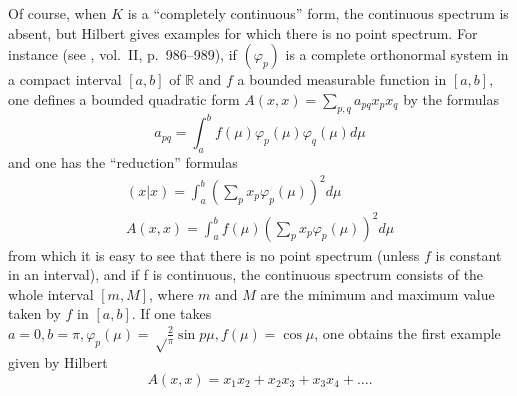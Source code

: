 \documentclass[12pt,a4paper,leqno,twoside]{extbook}
\newcommand{\R}{\mathbb{R}}
\begin{document}
Of course, when \(K\) is a ``completely continuous'' form, the continuous spectrum is absent, but Hilbert gives examples for which there is no point spectrum. For instance (see \cite{183}, vol.~II, p.~986--989), if \((\varphi_p)\) is a complete orthonormal system in a compact interval \([a,b]\) of \(\R\) and \(f\) a bounded measurable function in \([a,b]\), one defines a bounded quadratic form \(A(x,x) = \sum\limits_{p,q} a_{pq} x_p x_q\) by the formulas
\begin{equation}
    \label{eq:7.9}
    a_{pq} = \int_a^b f(\mu) \varphi_p(\mu) \varphi_q(\mu) d\mu
\end{equation}
and one has the ``reduction'' formulas
\begin{equation}
    \label{eq:7.10}
    \begin{gathered}
        (x|x) = \int_a^b \left( \sum_p x_p \varphi_p(\mu) \right)^2 d\mu \\
        A(x,x) = \int_a^b f(\mu) \left( \sum_p x_p \varphi_p(\mu) \right)^2 d\mu
    \end{gathered}
\end{equation}
from which it is easy to see that there is no point spectrum (unless \(f\) is constant in an interval), and if f is continuous, the continuous spectrum consists of the whole interval \([m,M]\), where \(m\) and \(M\) are the minimum and maximum value taken by \(f\) in \([a,b]\). If one takes \(a = 0, b = \pi, \varphi_p(\mu) = \sqrt\frac{2}{\pi} \sin{p\mu}, f(\mu) = \cos{\mu}\), one obtains the first example given by Hilbert
\begin{equation}
    \label{eq:7.11}
    A(x,x) = x_1 x_2 + x_2 x_3 + x_3 x_4 + \ldots .
\end{equation}
\end{document}
